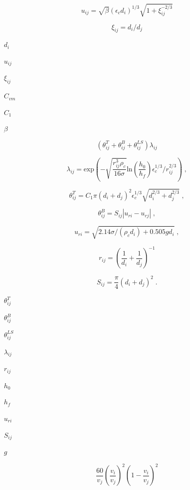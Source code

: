 \documentclass{article}
\begin{document}
\[
    u_{ij} = \sqrt{\beta} (\epsilon_c d_i)^{1/3} \sqrt{1 + \xi_{ij}^{-2/3}}
\]
\pagebreak

\[
    \xi_{ij} = d_i/d_j
\]
\pagebreak

$        d_i         $
\pagebreak

$        u_{ij}      $
\pagebreak

$        \xi_{ij}    $
\pagebreak

$        C_{vm}      $
\pagebreak

$        C_1         $
\pagebreak

$        \beta       $
\pagebreak

\[
    \left( \theta_{ij}^{T} + \theta_{ij}^{B} + \theta_{ij}^{LS} \right)
    \lambda_{ij}
\]
\pagebreak

\[
    \lambda_{ij} =
        \mathrm{exp}
        \left(
          - \sqrt{\frac{r_{ij}^3 \rho_c}{16 \sigma}}
            \mathrm{ln} \left(\frac{h_0}{h_f}\right)
            \epsilon_c^{1/3}/r_{ij}^{2/3}
        \right)\;,
\]
\pagebreak

\[
    \theta_{ij}^{T} =
        C_1 \pi (d_i + d_j)^{2} \epsilon_c^{1/3}
        \sqrt{d_{i}^{2/3} + d_{j}^{2/3}}\;,
\]
\pagebreak

\[
    \theta_{ij}^{B} = S_{ij} \left| u_{ri} - u_{rj} \right|\;,
\]
\pagebreak

\[
    u_{ri} = \sqrt{2.14 \sigma / \left(\rho_c d_i \right) + 0.505 g d_i}\;,
\]
\pagebreak

\[
    r_{ij} = \left( \frac{1}{d_i} + \frac{1}{d_j} \right)^{-1}
\]
\pagebreak

\[
    S_{ij} = \frac{\pi}{4} \left(d_i + d_j\right)^{2}\;.
\]
\pagebreak

$        \theta_{ij}^{T}   $
\pagebreak

$        \theta_{ij}^{B}   $
\pagebreak

$        \theta_{ij}^{LS}  $
\pagebreak

$        \lambda_{ij}      $
\pagebreak

$        r_{ij}            $
\pagebreak

$        h_0               $
\pagebreak

$        h_f               $
\pagebreak

$        u_{ri}            $
\pagebreak

$        S_{ij}            $
\pagebreak

$        g                 $
\pagebreak

\[
    \frac{60}{v_j} \left(\frac{v_i}{v_j}\right)^{2}
    \left(1 - \frac{v_i}{v_j}\right)^{2}
\]
\pagebreak
\end{document}
